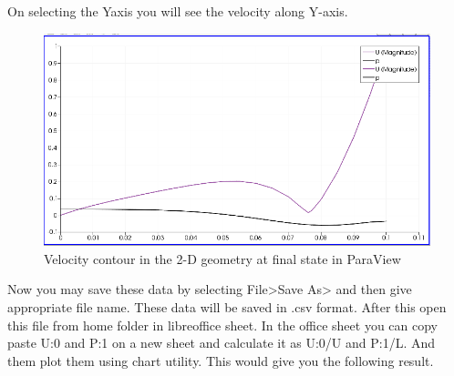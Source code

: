 \documentclass[a4paper,12pt]{report}
\begin{document}
\flushleft On selecting the Yaxis you will see the velocity along Y-axis.

\begin{figure}[ht]  
\begin{center}  
\includegraphics[scale=0.24]{yaxisvel.png}
\caption{Velocity contour in the 2-D geometry at final state in ParaView}
\label{yaxisvel}
\end{center}  
\end{figure}

\flushleft Now you may save these data by selecting File>Save As> and then give appropriate file name. These data will be saved in .csv format. After this open this file from home folder in libreoffice sheet. In the office sheet you can copy paste U:0 and P:1 on a new sheet and calculate it as U:0/U and P:1/L. And them plot them using chart utility. This would give you the following result.
\end{document}
